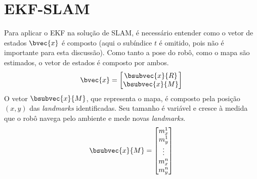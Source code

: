 \section{EKF-SLAM}
Para aplicar o EKF na solução de SLAM, é necessário entender 
como o vetor de estados $\bvec{x}$ é composto (aqui o subíndice $t$ é omitido, pois não é importante para esta discussão). Como tanto a pose do 
robô, como o mapa são estimados, o vetor de estados é composto por ambos. 
\begin{equation}
  \bvec{x} = \begin{bmatrix}
    \bsubvec{x}{R} \\
    \bsubvec{x}{M}
  \end{bmatrix}
  \label{eq:slam-state-vector}
\end{equation}
O vetor $\bsubvec{x}{M}$, que representa o mapa, é composto pela posição $(x, y)$ das \textit{landmarks} identificadas. 
Seu tamanho é variável e cresce à medida que o robô navega pelo ambiente e 
mede novas \textit{landmarks}.
\begin{equation}
  \bsubvec{x}{M} = \begin{bmatrix}
    m_x^1\\
    m_y^1\\
    \vdots\\
    m_x^n\\
    m_y^n
  \end{bmatrix}
  \label{eq:feature-map}
\end{equation}

